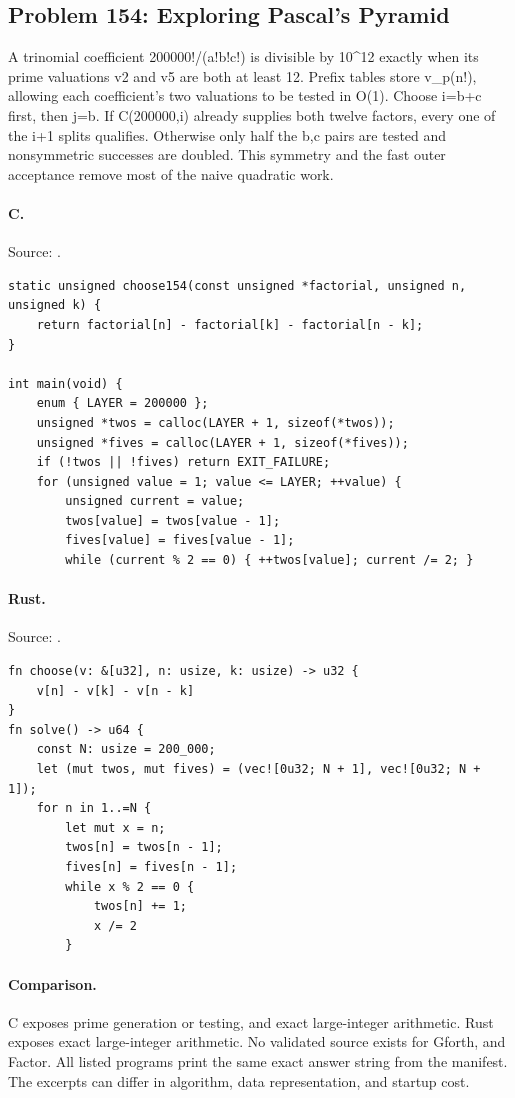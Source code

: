 \subsection{Problem 154: Exploring Pascal's Pyramid}
\label{walkthrough:p154}
A trinomial coefficient 200000!/(a!b!c!) is divisible by 10\textasciicircum{}12 exactly when its prime valuations v2 and v5 are both at least 12. Prefix tables store v\_p(n!), allowing each coefficient's two valuations to be tested in O(1). Choose i=b+c first, then j=b. If C(200000,i) already supplies both twelve factors, every one of the i+1 splits qualifies. Otherwise only half the b,c pairs are tested and nonsymmetric successes are doubled. This symmetry and the fast outer acceptance remove most of the naive quadratic work.

\paragraph{C.} Source: .
\begin{lstlisting}
static unsigned choose154(const unsigned *factorial, unsigned n, unsigned k) {
    return factorial[n] - factorial[k] - factorial[n - k];
}

int main(void) {
    enum { LAYER = 200000 };
    unsigned *twos = calloc(LAYER + 1, sizeof(*twos));
    unsigned *fives = calloc(LAYER + 1, sizeof(*fives));
    if (!twos || !fives) return EXIT_FAILURE;
    for (unsigned value = 1; value <= LAYER; ++value) {
        unsigned current = value;
        twos[value] = twos[value - 1];
        fives[value] = fives[value - 1];
        while (current % 2 == 0) { ++twos[value]; current /= 2; }
\end{lstlisting}

\paragraph{Rust.} Source: .
\begin{lstlisting}
fn choose(v: &[u32], n: usize, k: usize) -> u32 {
    v[n] - v[k] - v[n - k]
}
fn solve() -> u64 {
    const N: usize = 200_000;
    let (mut twos, mut fives) = (vec![0u32; N + 1], vec![0u32; N + 1]);
    for n in 1..=N {
        let mut x = n;
        twos[n] = twos[n - 1];
        fives[n] = fives[n - 1];
        while x % 2 == 0 {
            twos[n] += 1;
            x /= 2
        }
\end{lstlisting}

\paragraph{Comparison.}
C exposes prime generation or testing, and exact large-integer arithmetic. Rust exposes exact large-integer arithmetic.
No validated source exists for Gforth, and Factor.
All listed programs print the same exact answer string from the manifest. The excerpts can differ in algorithm, data representation, and startup cost.

